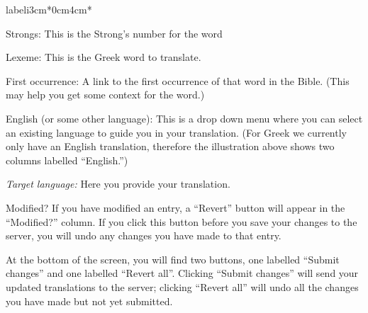 \documentclass[11pt,oneside,a4paper]{memoir}
\begin{document}
\begin{flexlabelled}{labeli}{3cm}{*}{0cm}{4cm}{*}
\item[Strongs:] This is the Strong's number for the word
\item[Lexeme:] This is the Greek word to translate.
\item[First occurrence:\hfill] A link to the first occurrence of that word in the Bible. (This may
  help you get some context for the word.)
\item[English (or some other language):] This is a drop down menu where you can select an existing
  language to guide you in your translation. (For Greek we currently only have an English translation,
  therefore the illustration above shows two columns labelled ``English.'')
\item[\emph{Target language:}\hfill]  Here you provide your translation.
\item[Modified?] If you have modified an entry, a ``Revert'' button will appear in the ``Modified?''
  column. If you click this button before you save your changes to the server, you will undo any
  changes you have made to that entry.
\end{flexlabelled}

At the bottom of the screen, you will find two buttons, one labelled ``Submit changes'' and one
labelled ``Revert all''. Clicking ``Submit changes'' will send your updated translations to the server;
clicking ``Revert all'' will undo all the changes you have made but not yet submitted.
\end{document}
